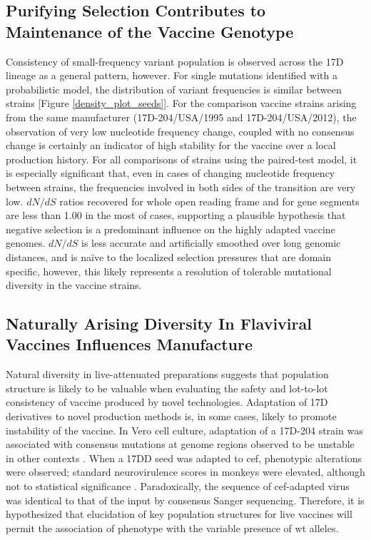 	\subsection{Purifying Selection Contributes to Maintenance of the Vaccine Genotype}
Consistency of small-frequency variant population is observed across the 17D lineage as a general pattern, however. For single mutations identified with a probabilistic model, the distribution of variant frequencies is similar between strains [Figure \ref{density_plot_seeds}]. For the comparison vaccine strains arising from the same manufacturer (17D-204/USA/1995 and 17D-204/USA/2012), the observation of very low nucleotide frequency change, coupled with no consensus change is certainly an indicator of high stability for the vaccine over a local production history. For all comparisons of strains using the paired-test model, it is especially significant that, even in cases of changing nucleotide frequency between strains, the frequencies involved in both sides of the transition are very low. $dN/dS$ ratios recovered for whole open reading frame and for gene segments are less than 1.00 in the most of cases, supporting a plausible hypothesis that negative selection is a predominant influence on the highly adapted vaccine genomes. $dN/dS$ is less accurate and artificially smoothed over long genomic distances, and is naïve to the localized selection pressures that are domain specific, however, this likely represents a resolution of tolerable mutational diversity in the vaccine strains.
\subsection{Naturally Arising Diversity In Flaviviral Vaccines Influences Manufacture}
Natural diversity in live-attenuated preparations suggests that population structure is likely to be valuable when evaluating the safety and lot-to-lot consistency of vaccine produced by novel technologies. Adaptation of 17D derivatives to novel production methods is, in some cases, likely to promote instability of the vaccine. In Vero cell culture, adaptation of a 17D-204 strain was associated with consensus mutations at genome regions observed to be unstable in other contexts \parencite{Beasley:2013ff}. When a 17DD seed was adapted to \gls{cef}, phenotypic alterations were observed; standard neurovirulence scores in monkeys were elevated, although not to statistical significance \parencite{Freire:2005iw}. Paradoxically, the sequence of \gls{cef}-adapted virus was identical to that of the input by consensus Sanger sequencing. Therefore, it is hypothesized that elucidation of key population structures for live vaccines will permit the association of phenotype with the variable presence of \gls{wt} alleles.

